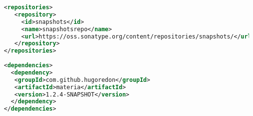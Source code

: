 \begin{lstlisting}[language=XML,morekeywords={repositories,
    repository,id,name,url,groupId,artifactId,dependencies,dependency}]
<repositories>
   <repository>
     <id>snapshots</id>
     <name>snapshotsrepo</name>
     <url>https://oss.sonatype.org/content/repositories/snapshots/</url>
   </repository>
</repositories>
 
<dependencies>
  <dependency>
   <groupId>com.github.hugoredon</groupId>
   <artifactId>materia</artifactId>
   <version>1.2.4-SNAPSHOT</version>
  </dependency>
</dependencies>
\end{lstlisting}